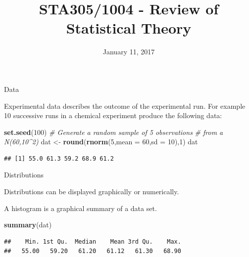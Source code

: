 \documentclass[9pt,ignorenonframetext,]{beamer}
\title{STA305/1004 - Review of Statistical Theory}
\date{January 11, 2017}
\newenvironment{Shaded}{\begin{snugshade}}{\end{snugshade}}
\newcommand{\KeywordTok}[1]{\textcolor[rgb]{0.13,0.29,0.53}{\textbf{{#1}}}}
\newcommand{\DataTypeTok}[1]{\textcolor[rgb]{0.13,0.29,0.53}{{#1}}}
\newcommand{\DecValTok}[1]{\textcolor[rgb]{0.00,0.00,0.81}{{#1}}}
\newcommand{\StringTok}[1]{\textcolor[rgb]{0.31,0.60,0.02}{{#1}}}
\newcommand{\CommentTok}[1]{\textcolor[rgb]{0.56,0.35,0.01}{\textit{{#1}}}}
\newcommand{\NormalTok}[1]{{#1}}
\begin{document}
\frame{\titlepage}

\begin{frame}[fragile]{Data}

Experimental data describes the outcome of the experimental run. For
example 10 successive runs in a chemical experiment produce the
following data:

\begin{Shaded}
\begin{Highlighting}[]
\KeywordTok{set.seed}\NormalTok{(}\DecValTok{100}\NormalTok{)}
\CommentTok{# Generate a random sample of 5 observations }
\CommentTok{# from a N(60,10^2)}
\NormalTok{dat <-}\StringTok{ }\KeywordTok{round}\NormalTok{(}\KeywordTok{rnorm}\NormalTok{(}\DecValTok{5}\NormalTok{,}\DataTypeTok{mean =} \DecValTok{60}\NormalTok{,}\DataTypeTok{sd =} \DecValTok{10}\NormalTok{),}\DecValTok{1}\NormalTok{) }
\NormalTok{dat}
\end{Highlighting}
\end{Shaded}

\begin{verbatim}
## [1] 55.0 61.3 59.2 68.9 61.2
\end{verbatim}

\end{frame}

\begin{frame}[fragile]{Distributions}

Distributions can be displayed graphically or numerically.

A histogram is a graphical summary of a data set.

\begin{Shaded}
\begin{Highlighting}[]
\KeywordTok{summary}\NormalTok{(dat)}
\end{Highlighting}
\end{Shaded}

\begin{verbatim}
##    Min. 1st Qu.  Median    Mean 3rd Qu.    Max. 
##   55.00   59.20   61.20   61.12   61.30   68.90
\end{verbatim}

\end{frame}
\end{document}
